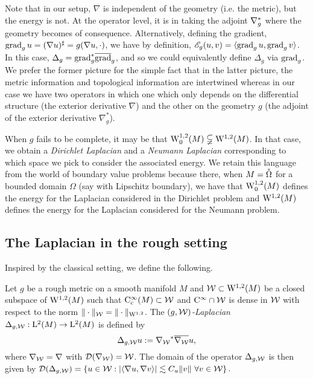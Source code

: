 \documentclass[a4paper, 12pt]{amsart}
\begin{document}
Note that in our setup, $\nabla$ is independent of the geometry (i.e. the metric), but the energy is not. At the operator level, it is in taking the adjoint $\adj{\nabla}_g$ where the geometry becomes of consequence. Alternatively, defining the gradient, $\grad_g u =  (\nabla u)^\sharp = g(\nabla u, \cdot)$, we have by definition, $\sE_g(u,v) = \inprod{\grad_g u, \grad_g v}$. In this case, $\Delta_g = \adj{\grad}_g \close{\grad}_g$, and so we could equivalently define \(\Delta_g\) via \(\grad_g\). We prefer the former picture for the simple fact that in the latter picture, the metric information and topological information are intertwined whereas in our case we have two operators in which one which only depends on the differential structure (the exterior derivative $\nabla$) and the other on the geometry $g$ (the adjoint of the exterior derivative $\nabla^\ast_g$).

When $g$ fails to be complete, it may be that  
$\SobH[0]{1}(M) \subsetneqq  \SobH{1}(M)$.
In that case, we obtain a \emph{Dirichlet Laplacian} and  a \emph{Neumann 
Laplacian} corresponding to which space we pick 
to consider the associated energy.
We retain this language from the world of boundary 
value problems because there, when $M = \interior\Omega$
for a bounded domain $\Omega$ (say with Lipschitz boundary), we have that
$\SobH[0]{1}(M)$ defines the energy for
the Laplacian considered in the Dirichlet problem
and $\SobH{1}(M)$ defines the energy 
for the Laplacian considered for the Neumann problem.

\subsection{The Laplacian in the rough setting}
Inspired by the classical setting, we define
the following.
 
\begin{defn}[$(g,\cW)$-Laplacian]
Let \(g\) be a rough metric on a smooth manifold \(M\)
and $\cW \subset \SobH{1}(M)$ be a closed subspace
of $\SobH{1}(M)$ such that $\Ck[c]{\infty}(M) \subset \cW$
and $\Ck{\infty} \cap \cW$ is dense in $\cW$ with respect to the norm $\norm{\cdot}_{\cW} = \norm{\cdot}_{\SobH{1}}$. The \emph{$(g,\cW)$-Laplacian}
\(\Delta_{g,\cW} : \Lp{2}(M) \to \Lp{2}(M)\) is defined by
\[
\Delta_{g,\cW} u := \adj{\nabla_{\cW}} \close{ \nabla_{\cW}} u,
\]
where  $\nabla_{\cW} = \nabla$ with $\dom(\nabla_{\cW}) = \cW$. 
The domain of the operator $\Delta_{g,\cW}$ is then given by
$\dom(\Delta_{g,\cW}) = \set{u \in \cW: \modulus{\inprod{\nabla u, \nabla v}} \lesssim C_u \norm{v}\ \forall v \in \cW}.$
\end{defn}
\end{document}
